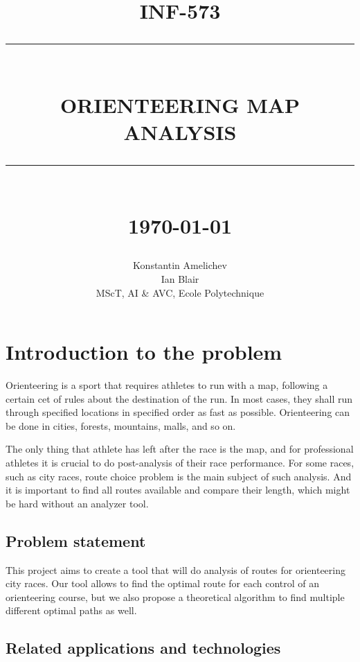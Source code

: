 \documentclass[a4paper,12pt]{extarticle}
\newcommand{\HRule}[1]{\rule{\linewidth}{#1}}
\begin{document}
\title{ \normalsize \textsc{INF-573}
		\\ [2.0cm]
		\HRule{0.5pt} \\
		\LARGE \textbf{\uppercase{Orienteering Map Analysis}}
		\HRule{2pt} \\ [0.5cm]
		\normalsize \today \vspace*{5\baselineskip}}

\date{}

\author{
		Konstantin Amelichev \\ 
		Ian Blair \\
        MScT, AI \& AVC, Ecole Polytechnique}

\maketitle
\newpage


\section{Introduction to the problem}

Orienteering \cite{orienteering} is a sport that requires athletes to run with a map, following a certain cet of rules about the destination of the run.
In most cases, they shall run through specified locations in specified order as fast as possible.
Orienteering can be done in cities, forests, mountains, malls, and so on.

The only thing that athlete has left after the race is the map, and for professional athletes it is crucial to do post-analysis of their race performance.
For some races, such as city races, route choice problem is the main subject of such analysis.
And it is important to find all routes available and compare their length, which might be hard without an analyzer tool.

\subsection{Problem statement}

This project aims to create a tool that will do analysis of routes for orienteering city races.
Our tool allows to find the optimal route for each control of an orienteering course, but we also propose a theoretical
algorithm to find multiple different optimal paths as well.

\subsection{Related applications and technologies}
\end{document}
